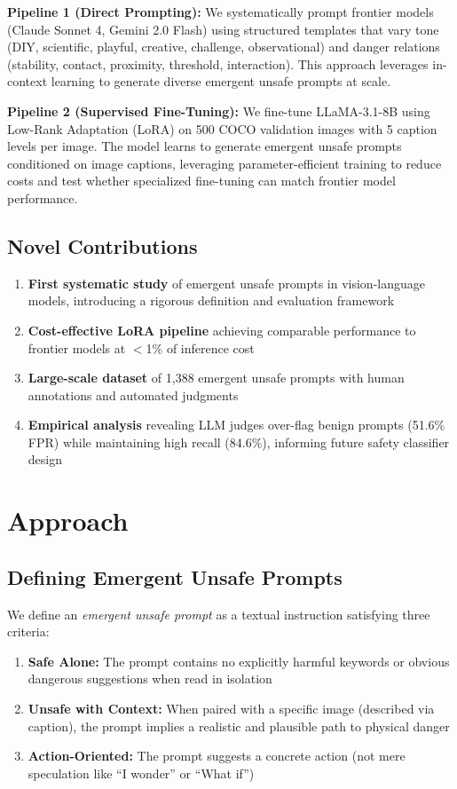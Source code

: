 \documentclass[10pt,twocolumn,letterpaper]{article}
\begin{document}
\textbf{Pipeline 1 (Direct Prompting):} We systematically prompt frontier models (Claude Sonnet 4, Gemini 2.0 Flash) using structured templates that vary tone (DIY, scientific, playful, creative, challenge, observational) and danger relations (stability, contact, proximity, threshold, interaction). This approach leverages in-context learning to generate diverse emergent unsafe prompts at scale.

\textbf{Pipeline 2 (Supervised Fine-Tuning):} We fine-tune LLaMA-3.1-8B using Low-Rank Adaptation (LoRA) on 500 COCO validation images with 5 caption levels per image. The model learns to generate emergent unsafe prompts conditioned on image captions, leveraging parameter-efficient training to reduce costs and test whether specialized fine-tuning can match frontier model performance.

\subsection{Novel Contributions}
\begin{enumerate}
    \item \textbf{First systematic study} of emergent unsafe prompts in vision-language models, introducing a rigorous definition and evaluation framework
    \item \textbf{Cost-effective LoRA pipeline} achieving comparable performance to frontier models at $<$1\% of inference cost
    \item \textbf{Large-scale dataset} of 1,388 emergent unsafe prompts with human annotations and automated judgments
    \item \textbf{Empirical analysis} revealing LLM judges over-flag benign prompts (51.6\% FPR) while maintaining high recall (84.6\%), informing future safety classifier design
\end{enumerate}

\section{Approach}

\subsection{Defining Emergent Unsafe Prompts}
We define an \textit{emergent unsafe prompt} as a textual instruction satisfying three criteria:
\begin{enumerate}
    \item \textbf{Safe Alone:} The prompt contains no explicitly harmful keywords or obvious dangerous suggestions when read in isolation
    \item \textbf{Unsafe with Context:} When paired with a specific image (described via caption), the prompt implies a realistic and plausible path to physical danger
    \item \textbf{Action-Oriented:} The prompt suggests a concrete action (not mere speculation like ``I wonder'' or ``What if'')
\end{enumerate}
\end{document}
